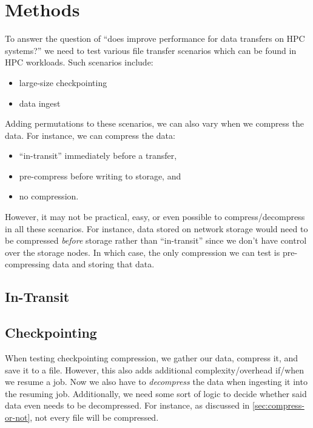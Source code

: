 \chapter{Methods}
\label{sec:methods}

To answer the question of ``does \openzl{} improve performance for data transfers
on HPC systems?'' we need to test various file transfer scenarios which can be
found in HPC workloads. Such scenarios include:
\begin{itemize}
\item large-size checkpointing
\item data ingest
\end{itemize}

Adding permutations to these scenarios, we can also vary when we compress the
data. For instance, we can compress the data:
\begin{itemize}
\item ``in-transit'' immediately before a transfer,
\item pre-compress before writing to storage, and
\item no compression.
\end{itemize}


However, it may not be practical, easy, or even possible to compress/decompress
in all these scenarios. For instance, data stored on network storage would need
to be compressed \emph{before} storage rather than ``in-transit'' since we don't
have control over the storage nodes. In which case, the only compression we can
test is pre-compressing data and storing that data.


\section{In-Transit}
\label{sec:in-transit-method}

\section{Checkpointing}
\label{sec:checkpoint-method}
When testing checkpointing compression, we gather our data, compress it, and
save it to a file. However, this also adds additional complexity/overhead
if/when we resume a job. Now we also have to \emph{decompress} the data when
ingesting it into the resuming job. Additionally, we need some sort of logic to
decide whether said data even needs to be decompressed. For instance, as
discussed in \cref{sec:compress-or-not}, not every file will be compressed.

